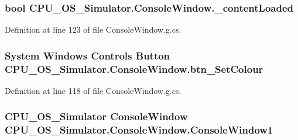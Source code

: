 \subsubsection[{\+\_\+content\+Loaded}]{\setlength{\rightskip}{0pt plus 5cm}bool C\+P\+U\+\_\+\+O\+S\+\_\+\+Simulator.\+Console\+Window.\+\_\+content\+Loaded\hspace{0.3cm}{\ttfamily [private]}}\label{class_c_p_u___o_s___simulator_1_1_console_window_a4836f04e93faa3749609d7eba72e1712}


Definition at line 123 of file Console\+Window.\+g.\+cs.

\hypertarget{class_c_p_u___o_s___simulator_1_1_console_window_a374a86e391068f8d05edb9649ce3d7f4}{}
\subsubsection[{btn\+\_\+\+Set\+Colour}]{\setlength{\rightskip}{0pt plus 5cm}System Windows Controls Button C\+P\+U\+\_\+\+O\+S\+\_\+\+Simulator.\+Console\+Window.\+btn\+\_\+\+Set\+Colour\hspace{0.3cm}{\ttfamily [package]}}\label{class_c_p_u___o_s___simulator_1_1_console_window_a374a86e391068f8d05edb9649ce3d7f4}


Definition at line 118 of file Console\+Window.\+g.\+cs.

\hypertarget{class_c_p_u___o_s___simulator_1_1_console_window_aac987ccfb7f82cf736d42355f96e886b}{}
\subsubsection[{Console\+Window1}]{\setlength{\rightskip}{0pt plus 5cm}C\+P\+U\+\_\+\+O\+S\+\_\+\+Simulator {\bf Console\+Window} C\+P\+U\+\_\+\+O\+S\+\_\+\+Simulator.\+Console\+Window.\+Console\+Window1\hspace{0.3cm}{\ttfamily [package]}}\label{class_c_p_u___o_s___simulator_1_1_console_window_aac987ccfb7f82cf736d42355f96e886b}


